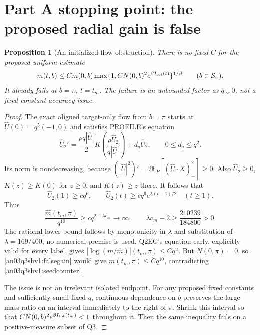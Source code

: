 \documentclass[11pt]{article}
\numberwithin{equation}{section}
\newtheorem{proposition}{Proposition}[section]
\theoremstyle{remark}\newtheorem{remark}[proposition]{Remark}
\newcommand{\E}{\mathbb E}
\newcommand{\Sm}{\mathcal S}
\begin{document}
\section{Part A stopping point: the proposed radial gain is false}
\begin{proposition}[An initialized-flow obstruction]
\label{an03q3sbv1:radialfailure}
There is no fixed $C$ for the proposed uniform estimate
\begin{equation}
 m(t,b)\le C m(0,b)
    \max\{1,CN(0,b)^2e^{\beta I_{\rm tot}(t)}\}^{1/\beta}
 \qquad (b\in\Sm_\pi).
 \label{an03q3sbv1:falsegain}
\end{equation}
It already fails at $b=\pi$, $t=t_m$.
The failure is an unbounded factor as $q\downarrow0$, not a
fixed-constant accuracy issue.
\end{proposition}
\begin{proof}
The exact aligned target-only flow from $b=\pi$ starts at
$\widehat U(0)=q^5(-1,0)$ and satisfies PROFILE's equation
\[
 \widehat U_2'
   =\frac{\rho q|\widehat U|}{2}
          K\left(\frac{\rho\widehat U_2}{q|\widehat U|}\right)
       +d_q\widehat U_2,\qquad 0\le d_q\le q^2.
\]
Its norm is nondecreasing, because
$(|\widehat U|^2)'=2\E_P[(\widehat U\cdot X)_+^2]\ge0$.
Also $\widehat U_2\ge0$, $K(z)\ge K(0)$ for $z\ge0$, and
$K(z)\ge z$ there. It follows that
\[
 \widehat U_2(1)\ge c q^6,\qquad
 \widehat U_2(t)\ge c q^6 e^{\lambda(t-1)/2}\quad(t\ge1).
\]
Thus
\begin{equation}
 \frac{\widehat m(t_m,\pi)}{q^{10}}
       \ge c q^{2-\lambda c_m}\longrightarrow\infty,\qquad
 \lambda c_m-2\ge\frac{210239}{184800}>0.
 \label{an03q3sbv1:seedcounter}
\end{equation}
The rational lower bound follows by monotonicity in $\lambda$ and
substitution of $\lambda=169/400$; no numerical premise is used.
Q2EC's equation early, explicitly valid for every label, gives
$|\log(m/\widehat m)|(t_m,\pi)\le Cq^u$.
But $N(0,\pi)=0$, so \eqref{an03q3sbv1:falsegain} would give
$m(t_m,\pi)\le Cq^{10}$, contradicting
\eqref{an03q3sbv1:seedcounter}.

The issue is not an irrelevant isolated endpoint. For any proposed
fixed constants and sufficiently small fixed $q$, continuous
dependence on $b$ preserves the large mass ratio on an interval
immediately to the right of $\pi$. Shrink this interval so that
$CN(0,b)^2e^{\beta I_{\rm tot}(t_m)}<1$ throughout it.
Then the same inequality fails on a positive-measure subset of Q3.
\end{proof}
\end{document}
